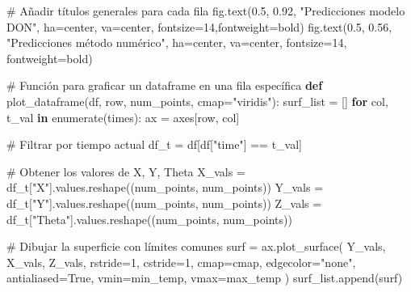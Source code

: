 \documentclass[
  spanish,
  us-letterpaper,
]{scrreprt}
\newenvironment{Shaded}{\begin{snugshade}}{\end{snugshade}}
\newcommand{\BuiltInTok}[1]{\textcolor[rgb]{0.00,0.23,0.31}{#1}}
\newcommand{\CommentTok}[1]{\textcolor[rgb]{0.37,0.37,0.37}{#1}}
\newcommand{\ControlFlowTok}[1]{\textcolor[rgb]{0.00,0.23,0.31}{\textbf{#1}}}
\newcommand{\DecValTok}[1]{\textcolor[rgb]{0.68,0.00,0.00}{#1}}
\newcommand{\FloatTok}[1]{\textcolor[rgb]{0.68,0.00,0.00}{#1}}
\newcommand{\KeywordTok}[1]{\textcolor[rgb]{0.00,0.23,0.31}{\textbf{#1}}}
\newcommand{\NormalTok}[1]{\textcolor[rgb]{0.00,0.23,0.31}{#1}}
\newcommand{\OperatorTok}[1]{\textcolor[rgb]{0.37,0.37,0.37}{#1}}
\newcommand{\StringTok}[1]{\textcolor[rgb]{0.13,0.47,0.30}{#1}}
\newcommand{\VariableTok}[1]{\textcolor[rgb]{0.07,0.07,0.07}{#1}}
\theoremstyle{plain}
\theoremstyle{definition}
\theoremstyle{remark}
\begin{document}
\begin{Shaded}
\begin{Highlighting}[]
\CommentTok{\# Añadir títulos generales para cada fila}
\NormalTok{fig.text(}\FloatTok{0.5}\NormalTok{, }\FloatTok{0.92}\NormalTok{, }\StringTok{"Predicciones modelo DON"}\NormalTok{, }
\NormalTok{        ha}\OperatorTok{=}\StringTok{\textquotesingle{}center\textquotesingle{}}\NormalTok{, va}\OperatorTok{=}\StringTok{\textquotesingle{}center\textquotesingle{}}\NormalTok{, fontsize}\OperatorTok{=}\DecValTok{14}\NormalTok{,fontweight}\OperatorTok{=}\StringTok{\textquotesingle{}bold\textquotesingle{}}\NormalTok{)}
\NormalTok{fig.text(}\FloatTok{0.5}\NormalTok{, }\FloatTok{0.56}\NormalTok{, }\StringTok{"Predicciones método numérico"}\NormalTok{,}
\NormalTok{        ha}\OperatorTok{=}\StringTok{\textquotesingle{}center\textquotesingle{}}\NormalTok{, va}\OperatorTok{=}\StringTok{\textquotesingle{}center\textquotesingle{}}\NormalTok{, fontsize}\OperatorTok{=}\DecValTok{14}\NormalTok{, fontweight}\OperatorTok{=}\StringTok{\textquotesingle{}bold\textquotesingle{}}\NormalTok{)}

\CommentTok{\# Función para graficar un dataframe en una fila específica}
\KeywordTok{def}\NormalTok{ plot\_dataframe(df, row, num\_points, cmap}\OperatorTok{=}\StringTok{"viridis"}\NormalTok{):}
\NormalTok{    surf\_list }\OperatorTok{=}\NormalTok{ []}
    \ControlFlowTok{for}\NormalTok{ col, t\_val }\KeywordTok{in} \BuiltInTok{enumerate}\NormalTok{(times):}
\NormalTok{        ax }\OperatorTok{=}\NormalTok{ axes[row, col]}
        
        \CommentTok{\# Filtrar por tiempo actual}
\NormalTok{        df\_t }\OperatorTok{=}\NormalTok{ df[df[}\StringTok{"time"}\NormalTok{] }\OperatorTok{==}\NormalTok{ t\_val]}

        \CommentTok{\# Obtener los valores de X, Y, Theta}
\NormalTok{        X\_vals }\OperatorTok{=}\NormalTok{ df\_t[}\StringTok{"X"}\NormalTok{].values.reshape((num\_points, num\_points))}
\NormalTok{        Y\_vals }\OperatorTok{=}\NormalTok{ df\_t[}\StringTok{"Y"}\NormalTok{].values.reshape((num\_points, num\_points))}
\NormalTok{        Z\_vals }\OperatorTok{=}\NormalTok{ df\_t[}\StringTok{"Theta"}\NormalTok{].values.reshape((num\_points, num\_points))}

        \CommentTok{\# Dibujar la superficie con límites comunes}
\NormalTok{        surf }\OperatorTok{=}\NormalTok{ ax.plot\_surface(}
\NormalTok{            Y\_vals, X\_vals, Z\_vals,}
\NormalTok{            rstride}\OperatorTok{=}\DecValTok{1}\NormalTok{, cstride}\OperatorTok{=}\DecValTok{1}\NormalTok{,}
\NormalTok{            cmap}\OperatorTok{=}\NormalTok{cmap,}
\NormalTok{            edgecolor}\OperatorTok{=}\StringTok{"none"}\NormalTok{,}
\NormalTok{            antialiased}\OperatorTok{=}\VariableTok{True}\NormalTok{,}
\NormalTok{            vmin}\OperatorTok{=}\NormalTok{min\_temp,}
\NormalTok{            vmax}\OperatorTok{=}\NormalTok{max\_temp}
\NormalTok{        )}
\NormalTok{        surf\_list.append(surf)}


\end{Highlighting}
\end{Shaded}
\end{document}
